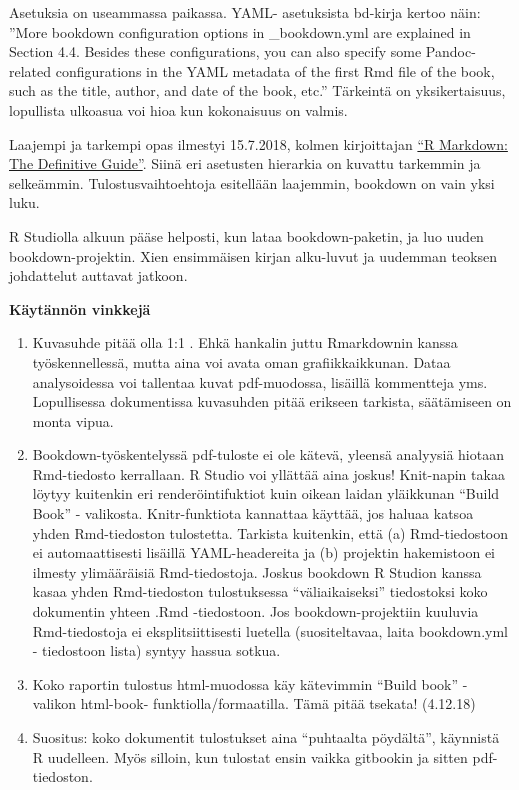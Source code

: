 \documentclass[
  finnish,
]{book}
\begin{document}
Asetuksia on useammassa paikassa. YAML- asetuksista bd-kirja kertoo näin: ''More bookdown configuration options in \_bookdown.yml are explained in Section 4.4. Besides these configurations, you can also specify some Pandoc-related configurations in the YAML metadata of the first Rmd file of the book, such as the title, author, and date of the book, etc.'' Tärkeintä on yksikertaisuus, lopullista ulkoasua voi hioa kun kokonaisuus on valmis.

Laajempi ja tarkempi opas ilmestyi 15.7.2018, kolmen kirjoittajan \href{https://bookdown.org/yihui/rmarkdown/}{``R Markdown: The Definitive Guide''}. Siinä eri asetusten hierarkia on kuvattu tarkemmin ja selkeämmin. Tulostusvaihtoehtoja esitellään laajemmin, bookdown on vain yksi luku.

R Studiolla alkuun pääse helposti, kun lataa bookdown-paketin, ja luo uuden bookdown-projektin. Xien ensimmäisen kirjan alku-luvut ja uudemman teoksen johdattelut auttavat jatkoon.

\textbf{Käytännön vinkkejä}

\begin{enumerate}
\def\labelenumi{\arabic{enumi}.}
\item
  Kuvasuhde pitää olla 1:1 . Ehkä hankalin juttu Rmarkdownin kanssa työskennellessä, mutta aina voi avata oman grafiikkaikkunan. Dataa analysoidessa voi tallentaa kuvat pdf-muodossa, lisäillä kommentteja yms. Lopullisessa dokumentissa kuvasuhden pitää erikseen tarkista, säätämiseen on monta vipua.
\item
  Bookdown-työskentelyssä pdf-tuloste ei ole kätevä, yleensä analyysiä hiotaan Rmd-tiedosto kerrallaan. R Studio voi yllättää aina joskus! Knit-napin takaa löytyy kuitenkin eri renderöintifuktiot kuin oikean laidan yläikkunan ``Build Book'' - valikosta. Knitr-funktiota kannattaa käyttää, jos haluaa katsoa yhden Rmd-tiedoston tulostetta. Tarkista kuitenkin, että (a) Rmd-tiedostoon ei automaattisesti lisäillä YAML-headereita ja (b) projektin hakemistoon ei ilmesty ylimääräisiä Rmd-tiedostoja. Joskus bookdown R Studion kanssa kasaa yhden Rmd-tiedoston tulostuksessa ``väliaikaiseksi'' tiedostoksi koko dokumentin yhteen .Rmd -tiedostoon. Jos bookdown-projektiin kuuluvia Rmd-tiedostoja ei eksplitsiittisesti luetella (suositeltavaa, laita bookdown.yml - tiedostoon lista) syntyy hassua sotkua.
\item
  Koko raportin tulostus html-muodossa käy kätevimmin ``Build book'' - valikon html-book- funktiolla/formaatilla. Tämä pitää tsekata! (4.12.18)
\item
  Suositus: koko dokumentit tulostukset aina ``puhtaalta pöydältä'', käynnistä R uudelleen. Myös silloin, kun tulostat ensin vaikka gitbookin ja sitten pdf-tiedoston.
\end{enumerate}
\end{document}
